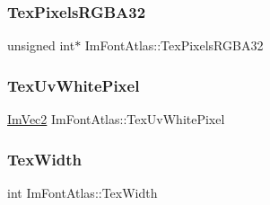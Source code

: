 \subsubsection{\texorpdfstring{Tex\+Pixels\+R\+G\+B\+A32}{TexPixelsRGBA32}}
{\footnotesize\ttfamily unsigned int$\ast$ Im\+Font\+Atlas\+::\+Tex\+Pixels\+R\+G\+B\+A32}

\hypertarget{struct_im_font_atlas_af1d05221e9a1607d7f625df92a4f9b7e}{}\label{struct_im_font_atlas_af1d05221e9a1607d7f625df92a4f9b7e} 
\subsubsection{\texorpdfstring{Tex\+Uv\+White\+Pixel}{TexUvWhitePixel}}
{\footnotesize\ttfamily \hyperlink{struct_im_vec2}{Im\+Vec2} Im\+Font\+Atlas\+::\+Tex\+Uv\+White\+Pixel}

\hypertarget{struct_im_font_atlas_a2d0662502433e7a87b3aa4681ba17aa3}{}\label{struct_im_font_atlas_a2d0662502433e7a87b3aa4681ba17aa3} 
\subsubsection{\texorpdfstring{Tex\+Width}{TexWidth}}
{\footnotesize\ttfamily int Im\+Font\+Atlas\+::\+Tex\+Width}

